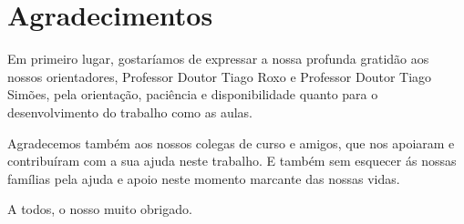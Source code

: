 \chapter*{Agradecimentos}
\label{chap:agrade}


Em primeiro lugar, gostaríamos de expressar a nossa profunda gratidão aos nossos orientadores, Professor Doutor Tiago Roxo e Professor Doutor Tiago Simões, pela orientação, paciência e disponibilidade quanto para o desenvolvimento do trabalho como as aulas.\par
Agradecemos também aos nossos colegas de curso e amigos, que nos apoiaram e contribuíram com a sua ajuda neste trabalho. E também sem esquecer ás nossas famílias pela ajuda e apoio neste momento marcante das nossas vidas.\par
A todos, o nosso muito obrigado.